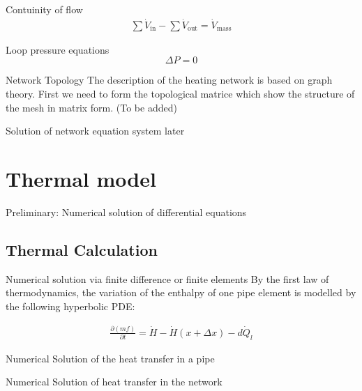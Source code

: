 \documentclass[xcolor=dvipsnames]{beamer}
\begin{document}
\begin{frame}{Contuinity of flow}
\begin{align}
		\sum \dot{V}_{\text{in}}-\sum \dot{V}_{\text{out}} = \dot{V}_{\text{mass}}
\end{align}
\end{frame}

\begin{frame}{Loop pressure equations}
	\[ \Delta P = 0 \]
\end{frame}
\begin{frame}{Network Topology}
The description of the heating network is based on graph theory. First we need to form the topological matrice which show the structure of the mesh in matrix form. (To be added)


\end{frame}

\begin{frame}{Solution of network equation system}
later
\end{frame}


\section{Thermal model}

\begin{frame}{Preliminary: Numerical solution of differential equations}
	
\end{frame}

\subsection{Thermal Calculation}

\begin{frame}{Numerical solution via finite difference or finite elements}
	By the first law of thermodynamics, the variation of the enthalpy of one pipe element is modelled by the
	following hyperbolic PDE:

	\begin{align}
		\frac{\partial(mf)}{\partial t}=\dot{H}-\dot{H}(x+\Delta x)-d\dot{Q}_l
	\end{align}
\end{frame}

\begin{frame}{Numerical Solution of the heat transfer in a pipe}
	
\end{frame}

\begin{frame}{Numerical Solution of heat transfer in the network}
	
\end{frame}
\end{document}
